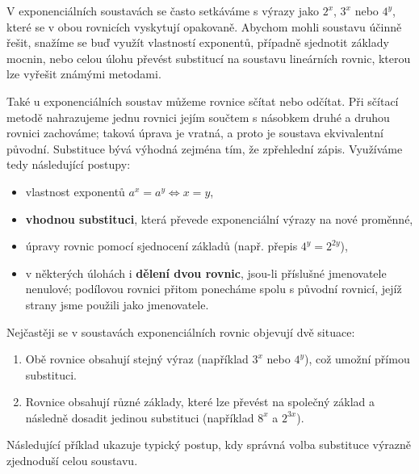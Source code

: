 \documentclass[12pt,a4paper]{article}
\begin{document}
\medskip

V exponenciálních soustavách se často setkáváme s výrazy jako $2^x$, $3^x$ nebo $4^y$, které
se v obou rovnicích vyskytují opakovaně. Abychom mohli soustavu účinně řešit, snažíme se buď
využít vlastností exponentů, případně sjednotit základy mocnin, nebo celou úlohu převést
substitucí na soustavu lineárních rovnic, kterou lze vyřešit známými metodami.

\medskip

Také u exponenciálních soustav můžeme rovnice sčítat nebo odčítat.
Při sčítací metodě nahrazujeme jednu rovnici jejím součtem s násobkem druhé a druhou rovnici zachováme;
taková úprava je vratná, a proto je soustava ekvivalentní původní.
Substituce bývá výhodná zejména tím, že zpřehlední zápis. Využíváme tedy následující postupy:

\begin{itemize}
    \item vlastnost exponentů $a^x = a^y \Longleftrightarrow x = y$,  
    \item \textbf{vhodnou substituci}, která převede exponenciální výrazy na nové proměnné,
    \item úpravy rovnic pomocí sjednocení základů (např. přepis $4^y = 2^{2y}$),
    \item v některých úlohách i \textbf{dělení dvou rovnic}, jsou-li příslušné jmenovatele nenulové;
          podílovou rovnici přitom ponecháme spolu s původní rovnicí, jejíž strany jsme použili jako jmenovatele.
\end{itemize}

Nejčastěji se v soustavách exponenciálních rovnic objevují dvě situace:

\begin{enumerate}[label=\arabic*.]
    \item Obě rovnice obsahují stejný výraz (například $3^x$ nebo $4^y$), což umožní přímou substituci.
    \item Rovnice obsahují různé základy, které lze převést na společný základ a následně dosadit 
          jedinou substituci (například $8^x$ a $2^{3x}$).
\end{enumerate}

Následující příklad ukazuje typický postup, kdy správná volba substituce výrazně zjednoduší celou soustavu.
\end{document}
